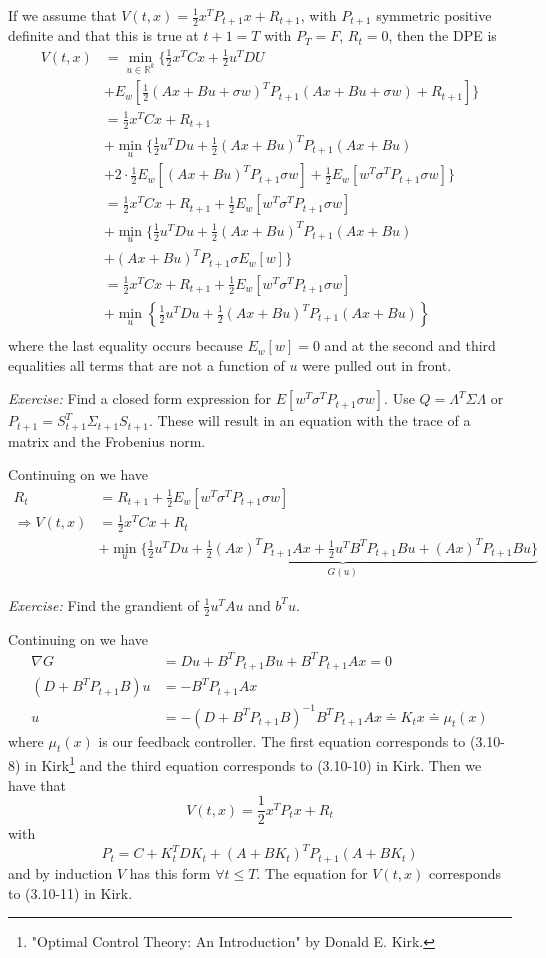 \documentclass[lecture,12pt,]{pcms-l}
\begin{document}
If we assume that $V(t,x) = \frac{1}{2}x^TP_{t+1}x + R_{t+1}$, with $P_{t+1}$ symmetric positive definite and that this is true at $t+1=T$ with $P_T=F$, $R_t=0$, then the DPE is
\begin{align*}
V(t,x) &= \min_{u\in\mathbb{R}^k}\{\frac{1}{2}x^TCx + \frac{1}{2}u^TDU  \\
&+ E_w[\frac{1}{2}(Ax+Bu+\sigma w)^TP_{t+1}(Ax+Bu+\sigma w) + R_{t+1}]\} \\
&= \frac{1}{2}x^TCx + R_{t+1} \\
&+ \min_u \{\frac{1}{2}u^TDu + \frac{1}{2}(Ax+Bu)^TP_{t+1}(Ax+Bu) \\
&+ 2\cdot\frac{1}{2}E_w[(Ax+Bu)^TP_{t+1}\sigma w] + \frac{1}{2}E_w[w^T\sigma^TP_{t+1}\sigma w]\} \\
&= \frac{1}{2}x^TCx + R_{t+1} + \frac{1}{2}E_w[w^T\sigma^TP_{t+1}\sigma w] \\
&+ \min_u \{ \frac{1}{2}u^TDu + \frac{1}{2}(Ax+Bu)^TP_{t+1}(Ax+Bu) \\
&+ (Ax+Bu)^TP_{t+1}\sigma E_w[w] \} \\
&= \frac{1}{2}x^TCx + R_{t+1} + \frac{1}{2}E_w[w^T\sigma^TP_{t+1}\sigma w] \\
&+ \min_u \left\lbrace \frac{1}{2}u^TDu + \frac{1}{2}(Ax+Bu)^TP_{t+1}(Ax+Bu) \right\rbrace \\
\end{align*}
where the last equality occurs because $E_w[w]=0$ and at the second and third equalities all terms that are not a function of $u$ were pulled out in front.

\textit{Exercise:} Find a closed form expression for $E[w^T\sigma^TP_{t+1}\sigma w]$. Use $Q=\Lambda^T\Sigma\Lambda$ or $P_{t+1} = S_{t+1}^T\Sigma_{t+1}S_{t+1}$. These will result in an equation with the trace of a matrix and the Frobenius norm.

Continuing on we have
\begin{align*}
R_t &= R_{t+1} + \frac{1}{2}E_w[w^T\sigma^TP_{t+1}\sigma w] \\
\Rightarrow V(t,x) &= \frac{1}{2}x^TCx + R_t \\
&+ \min_u\{ \underbrace{\frac{1}{2}u^TDu + \frac{1}{2}(Ax)^TP_{t+1}Ax + \frac{1}{2}u^TB^TP_{t+1}Bu + (Ax)^TP_{t+1}Bu\}}_{G(u)}
\end{align*}

\textit{Exercise:} Find the grandient of $\frac{1}{2}u^TAu$ and $b^Tu$.

Continuing on we have
\begin{align*}
\nabla G &= Du + B^TP_{t+1}Bu + B^TP_{t+1}Ax = 0 \\
(D+B^TP_{t+1}B)u &= -B^TP_{t+1}Ax \\
u &= -(D+B^TP_{t+1}B)^{-1}B^TP_{t+1}Ax \doteq K_tx \doteq \mu_t(x)
\end{align*}
where $\mu_t(x)$ is our feedback controller. The first equation corresponds to (3.10-8) in Kirk\footnote{"Optimal Control Theory: An Introduction" by Donald E. Kirk.} and the third equation corresponds to (3.10-10) in Kirk. Then we have that
$$V(t,x) = \frac{1}{2}x^TP_tx + R_t$$
with
$$P_t = C+ K_t^TDK_t + (A+BK_t)^TP_{t+1}(A+BK_t)$$
and by induction $V$ has this form $\forall t\leq T$. The equation for $V(t,x)$ corresponds to (3.10-11) in Kirk.
\end{document}
